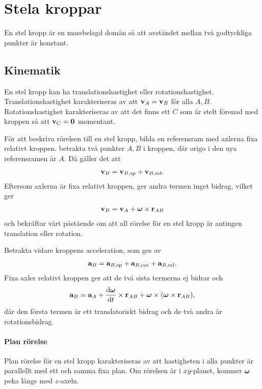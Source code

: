 \section{Stela kroppar}
En stel kropp är en massbelagd domän så att avståndet mellan två godtyckliga punkter är konstant.

\subsection{Kinematik}
En stel kropp kan ha translationshastighet eller rotationshastighet. Translationshastighet karakteriseras av att $\vb{v}_{A} = \vb{v}_{B}$ för alla $A, B$. Rotationshastighet karakteriseras av att det finns ett $C$ som är stelt förenad med kroppen så att $\vb{v}_{C} = \vb{0}$ momentant. 

För att beskriva rörelsen till en stel kropp, bilda en referensram med axlerna fixa relativt kroppen. betrakta två punkter $A, B$ i kroppen, där origo i den nya referensramen är $A$. Då gäller det att
\begin{align*}
	\vb{v}_{B} = \vb{v}_{B, \text{sp}} + \vb{v}_{B, \text{rel}}.
\end{align*}
Eftersom axlerna är fixa relativt kroppen, ger andra termen inget bidrag, vilket ger
\begin{align*}
	\vb{v}_{B} = \vb{v}_{A} + \vb*{\omega}\times\vb{r}_{AB}
\end{align*}
och bekräftar vårt påstående om att all rörelse för en stel kropp är antingen translation eller rotation.

Betrakta vidare kroppens acceleration, som ges av
\begin{align*}
	\vb{a}_{B} = \vb{a}_{B, \text{sp}} + \vb{a}_{B, \text{cor}} + \vb{a}_{B, \text{rel}}.
\end{align*}
Fixa axler relativt kroppen ger att de två sista termerna ej bidrar och
\begin{align*}
	\vb{a}_{B} = \vb{a}_{A} + \dv{\vb*{\omega}}{t}\times\vb{r}_{AB} + \vb*{\omega}\times(\vb*{\omega}\times\vb{r}_{AB}),
\end{align*}
där den första termen är ett translatoriskt bidrag och de två andra är rotationsbidrag.

\paragraph{Plan rörelse}
Plan rörelse för en stel kropp karakteriseras av att hastigheten i alla punkter är parallellt med ett och samma fixa plan. Om rörelsen är i $xy$-planet, kommer $\vb*{\omega}$ peka längs med $z$-axeln.


